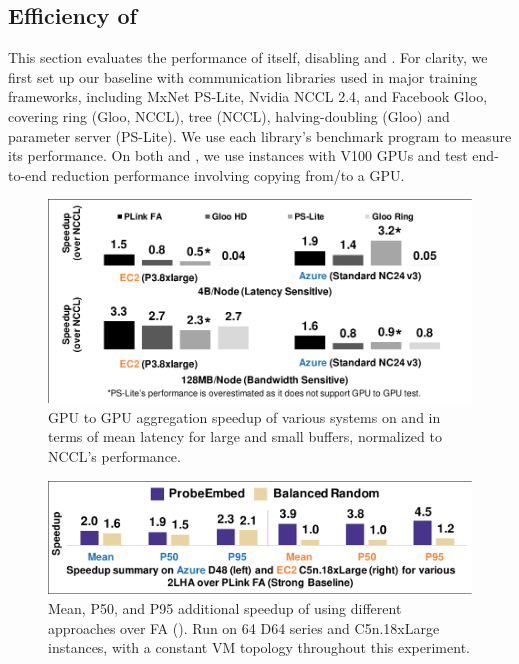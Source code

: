\subsection{Efficiency of \ha}
\label{sec:baseline}
This section evaluates the performance of \ha itself, disabling \marcopolo{} and \autoplink{}. %
For clarity, we first set up our baseline with communication libraries used in major training frameworks, including MxNet PS-Lite, Nvidia NCCL 2.4, and Facebook Gloo, covering ring (Gloo, NCCL), tree (NCCL), halving-doubling (Gloo) and parameter server (PS-Lite). %
We use each library's benchmark program to measure its performance. On both \azure and \ectwo, we use instances with V100 GPUs and test end-to-end reduction performance
involving copying from/to a GPU. %

\begin{figure}[t!]
	\centering
	\includegraphics[width=.7\linewidth, trim=2 3 3 3,clip]{Figures/baseline.pdf}
	\caption{GPU to GPU aggregation speedup of various systems on \azure and \ectwo in terms of mean latency for large and small buffers, normalized to NCCL's performance. }
	\label{fig:baseline}
\end{figure}

\begin{figure}[t!]
	\centering
	\includegraphics[width=.7\linewidth, trim=2 3 3 3,clip]{Figures/perfSummary.pdf}
	\caption{Mean, P50, and P95 additional speedup of \mlha using different approaches over FA (\strongbaseline). Run on 64 \azure D64 series and \ectwo C5n.18xLarge instances, with a constant VM topology throughout this experiment.}%
	\label{fig:perfSummary}
\end{figure}

